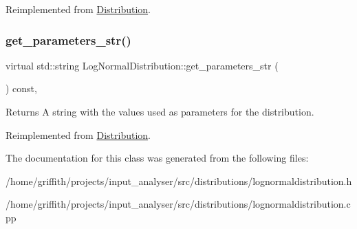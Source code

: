 Reimplemented from \hyperlink{classDistribution_a478a0c7b72d3ad266a2b6f1b9ed20fe9}{Distribution}.

\mbox{\label{classLogNormalDistribution_a5dfd7c43d883d868dab5d62e55a7e610}} 
\subsubsection{\texorpdfstring{get\+\_\+parameters\+\_\+str()}{get\_parameters\_str()}}
{\footnotesize\ttfamily virtual std\+::string Log\+Normal\+Distribution\+::get\+\_\+parameters\+\_\+str (\begin{DoxyParamCaption}{ }\end{DoxyParamCaption}) const\hspace{0.3cm}{\ttfamily [inline]}, {\ttfamily [virtual]}}

\begin{DoxyReturn}{Returns}
A string with the values used as parameters for the distribution. 
\end{DoxyReturn}


Reimplemented from \hyperlink{classDistribution_a716b7df9facb6bb016f46ac130297f9c}{Distribution}.



The documentation for this class was generated from the following files\+:\begin{DoxyCompactItemize}
\item 
/home/griffith/projects/input\+\_\+analyser/src/distributions/lognormaldistribution.\+h\item 
/home/griffith/projects/input\+\_\+analyser/src/distributions/lognormaldistribution.\+cpp\end{DoxyCompactItemize}
